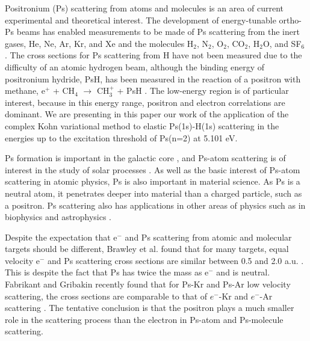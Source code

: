 \documentclass[reprint,showpacs,preprintnumbers,amsmath,amssymb,pra,aps]{revtex4-1}
\begin{document}
Positronium (Ps) scattering from atoms and molecules is an area of current experimental and theoretical interest. The development of energy-tunable ortho-Ps beams \cite{Brown1985,Laricchia1987,Zafar1996,Garner1996,Laricchia2008} has enabled measurements to be made of Ps scattering from the inert gases, He, Ne, Ar, Kr, and Xe \cite{Garner1996,Garner2000,Armitage2002,Laricchia2004,Armitage2006,Laricchia2008,Engbrecht2008,Brawley2010a} and the molecules H$_2$, N$_2$, O$_2$, CO$_2$, H$_2$O, and SF$_6$ \cite{Garner1996,Garner1998,Garner2000,Laricchia2004,Armitage2006,Beale2006,Brawley2010a}. The cross sections for Ps scattering from H have not been measured due to the difficulty
of an atomic hydrogen beam, although the binding energy of positronium hydride, PsH, has been measured in the reaction of a positron with methane, e$^+$ + CH$_4$ $\to$ CH$_3^+$ + PsH \cite{Schrader1992}.
The low-energy region is of particular interest, because in this energy range, positron and electron correlations are dominant. We are presenting in this paper our work of the application of the complex Kohn variational method to elastic Ps(1s)-H(1s) scattering in the energies up to the excitation threshold of Ps(n=2) at 5.101 eV.

Ps formation is important in the galactic core \cite{Kinzer1996}, and Ps-atom scattering is of interest in the study of solar processes \cite{Crannell1976}.
As well as the basic interest of Ps-atom scattering in atomic physics,
Ps is also important in material science.
As Ps is a neutral atom, it penetrates deeper into material than a charged particle,
such as a positron.
Ps scattering also has applications
in other areas of physics such as in biophysics and astrophysics \cite{Laricchia2012}.

Despite the expectation that e$^-$ and Ps scattering from atomic and molecular targets should be different, Brawley et al. found that for many targets, equal velocity e$^-$ and Ps scattering cross sections are similar between 0.5 and 2.0 a.u. \cite{Brawley2010a,Brawley2010}. This is despite the fact that Ps has twice the mass as e$^-$ and is neutral. Fabrikant and Gribakin recently found that for Ps-Kr and Ps-Ar low velocity scattering, the cross sections are comparable to that of $e^-$-Kr and $e^-$-Ar scattering \cite{Fabrikant2014,Fabrikant2014a}. The tentative conclusion is that the positron plays a much smaller role in the scattering process than the electron in Ps-atom and Ps-molecule scattering.
\end{document}
